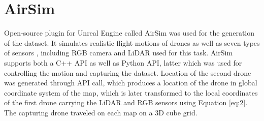 \documentclass[twoside]{ctuthesis}
\theoremstyle{plain}
\theoremstyle{definition}
\theoremstyle{note}
\begin{document}
\section{AirSim}
Open-source plugin for Unreal Engine called AirSim was used for the generation of the dataset. It simulates realistic flight motions of drones as well as seven types of sensors , including RGB camera and LiDAR used for this task. AirSim supports both a C++ API as well as Python API, latter which was used for controlling the motion and capturing the dataset. Location of the second drone was generated through API call, which produces a location of the drone in global coordinate system of the map, which is later transformed to the local coordinates of the first drone carrying the LiDAR and RGB sensors using Equation \ref{eq:2}. The capturing drone traveled on each map on a 3D cube grid.
\end{document}
